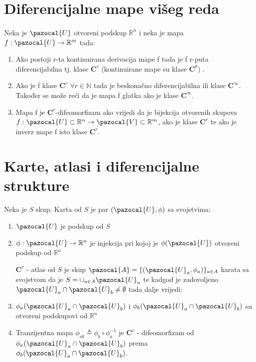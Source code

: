 \documentclass[times, utf8, diplomski, numeric]{fer}
\newcommand{\Va}{\pazocal{V}}
\newcommand{\Ua}{\pazocal{U}}
\newcommand{\Aa}{\pazocal{A}}
\begin{document}
\section{Diferencijalne mape višeg reda}

	\paragraph{} Neka je $\Ua$ otvoreni podskup $\mathbb{R}^n$ i neka je mapa $f: \Ua \rightarrow \mathbb{R}^m$ tada:
	\begin{enumerate}
		
		\item Ako postoji r-ta kontinuirana derivacija mape f tada je f r-puta diferencijabilna tj. klase $\boldsymbol{C}^r$ (kontinuirane mape su klase $\boldsymbol{C}^0$) .
		
		\item Ako je f klase $\boldsymbol{C}^r$ $\forall r \in \mathbb{N}$ tada je beskonačno diferencijabilna ili klase $\boldsymbol{C}^\infty$. Također se može reći da je mapa f glatka ako je klase $\boldsymbol{C}^\infty$.
		
		\item Mapa f je $\boldsymbol{C}^r$-difeomorfizam ako vrijedi da je bijekcija otvorenih skupova $f:\Ua \subset \mathbb{R}^n \rightarrow \Va \subset \mathbb{R}^m$, ako je klase $\boldsymbol{C}^r$ te ako je inverz mape f isto klase $\boldsymbol{C}^r$.
	
	\end{enumerate}
	
\section{Karte, atlasi i diferencijalne strukture}
	\paragraph{} Neka je $S$ skup. Karta od $S$ je par $(\Ua, \phi)$ sa svojstvima:
	\begin{enumerate}
		\item $\Ua$ je podskup od $S$
		\item $\phi: \Ua \rightarrow \mathbb{R}^n$ je injekcija pri kojoj je $\phi(\Ua)$ otvoreni podskup od $\mathbb{R}^n$
		
		$\boldsymbol{C}^r$ - atlas od $S$ je skup $\Aa = \{ (\Ua_a, \phi_a) \}_{a\in A}$ karata sa svojstvom da je $S = \cup_{a\in A}\Ua_a$ te kadgod je zadovoljeno $\Ua_a \cap \Ua_b \neq \emptyset$ tada dalje vrijedi:
		
		\item $\phi_a(\Ua_a \cap \Ua_b)$ i $\phi_b(\Ua_a\cap \Ua_b)$ su otvoreni podskupovi od $\mathbb{R}^n$
		\item Tranzijentna mapa $\phi_{ab} \triangleq \phi_b \circ \phi_a^{-1}$ je $\boldsymbol{C}^r$ - difeomorfizam od $\phi_a(\Ua_a \cap \Ua_b)$ prema $\phi_b(\Ua_a\cap \Ua_b)$.
	\end{enumerate}
	
\end{document}
